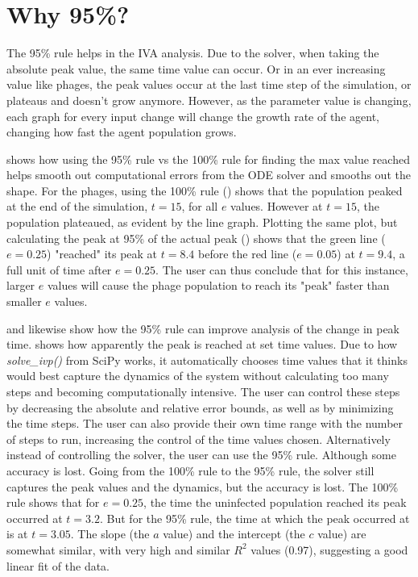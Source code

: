 \section{Why 95\%? }
\label{sec:appendixF:why_95}
The 95\% rule helps in the IVA analysis. 
Due to the solver, when taking the absolute peak value, the same time value can occur. 
Or in an ever increasing value like phages, the peak values occur at the last time step of the simulation, or plateaus and doesn't grow anymore. 
However, as the parameter value is changing, each graph for every input change will change the growth rate of the agent, changing how fast the agent population grows. 

 shows how using the 95\% rule vs the 100\% rule for finding the max value reached helps smooth out computational errors from the ODE solver and smooths out the shape. 
For the phages, using the 100\% rule () shows that the population peaked at the end of the simulation, $t=15$, for all $e$ values. 
However at $t=15$, the population plateaued, as evident by the line graph. 
Plotting the same plot, but calculating the peak at 95\% of the actual peak () shows that the green line ($e=0.25$) "reached" its peak at $t=8.4$ before the red line ($e=0.05$) at $t=9.4$, a full unit of time after $e=0.25$. 
The user can thus conclude that for this instance, larger $e$ values will cause the phage population to reach its "peak" faster than smaller $e$ values. 

 and  likewise show how the 95\% rule can improve analysis of the change in peak time. 
 shows how apparently the peak is reached at set time values. 
Due to how \textit{solve\_ivp()} from SciPy works, it automatically chooses time values that it thinks would best capture the dynamics of the system without calculating too many steps and becoming computationally intensive. 
The user can control these steps by decreasing the absolute and relative error bounds, as well as by minimizing the time steps. 
The user can also provide their own time range with the number of steps to run, increasing the control of the time values chosen. 
Alternatively instead of controlling the solver, the user can use the 95\% rule.
Although some accuracy is lost. 
Going from the 100\% rule to the 95\% rule, the solver still captures the peak values and the dynamics, but the accuracy is lost. 
The 100\% rule shows that for $e=0.25$, the time the uninfected population reached its peak occurred at $t=3.2$. 
But for the 95\% rule, the time at which the peak occurred at is at $t=3.05$. 
The slope (the $a$ value) and the intercept (the $c$ value) are somewhat similar, with very high and similar $R^2$ values (0.97), suggesting a good linear fit of the data. 

